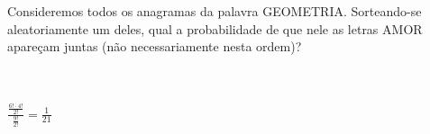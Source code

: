 \begin{ex}
 Consideremos todos os anagramas da palavra GEOMETRIA. Sorteando-se aleatoriamente um deles, qual a probabilidade de que nele as letras AMOR apareçam juntas (não necessariamente nesta ordem)?
   \begin{sol}
    \phantom{A}  \\  \\
    $\frac{\frac{6!\cdot4!}{2!}}{\frac{9!}{2!}}=\frac{1}{21}$
   \end{sol}
\end{ex}